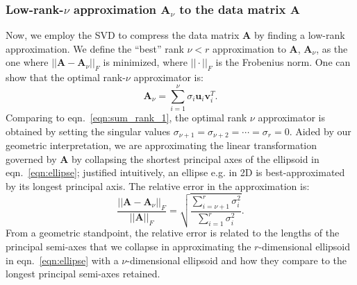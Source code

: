 \documentclass[journal=jacsat,manuscript=article,layout=traditional]{achemso}
\begin{document}
\subsubsection{Low-rank-$\nu$ approximation $\mathbf{A}_\nu$ to the data matrix $\mathbf{A}$}
Now, we employ the SVD to compress the data matrix $\mathbf{A}$ by finding a low-rank approximation. We define the ``best'' rank $\nu<r$ approximation to $\mathbf{A}$, $\mathbf{A}_\nu$, as the one where $||\mathbf{A}-\mathbf{A}_\nu||_F$ is minimized, where $||\cdot||_F$ is the Frobenius norm. One can show that the optimal rank-$\nu$ approximator is:
\begin{equation}
\mathbf{A}_\nu =  \displaystyle \sum_{i=1}^\nu \sigma_i \mathbf{u}_i\mathbf{v}_i^T.
\label{eq:Anu}
\end{equation} Comparing to eqn.~\ref{eqn:sum_rank_1}, the optimal rank $\nu$ approximator is obtained by setting the singular values $\sigma_{\nu+1}=\sigma_{\nu +2} = \cdots = \sigma_r = 0$. Aided by our geometric interpretation, we are approximating the linear transformation governed by $\mathbf{A}$ by collapsing the shortest principal axes of the ellipsoid in eqn.~\ref{eqn:ellipse}; justified intuitively, an ellipse e.g. in 2D is best-approximated by its longest principal axis. The relative error in the approximation is:
\begin{equation}
\frac{||\mathbf{A}-\mathbf{A}_\nu||_F}{||\mathbf{A}||_F} = \sqrt{\frac{ \displaystyle \sum_{i=\nu+1}^r \sigma_i^2}{\displaystyle \sum_{i=1}^r \sigma_i^2
}}.
\label{eq:relative_error}
\end{equation} From a geometric standpoint, the relative error is related to the lengths of the principal semi-axes that we collapse in approximating the $r$-dimensional ellipsoid in eqn.~\ref{eqn:ellipse} with a $\nu$-dimensional ellipsoid and how they compare to the longest principal semi-axes retained.
\end{document}
